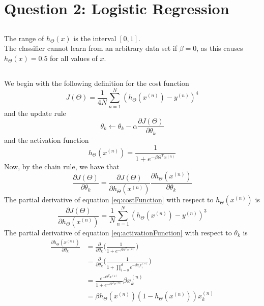 \documentclass [11pt]{article}
\begin{document}
\section{Question 2: Logistic Regression}
\subsection{}
The range of $h_{\Theta}(x)$ is the interval $[0,1]$.
\\
The classifier cannot learn from an arbitrary data set if $\beta = 0$, as this causes $h_{\Theta}(x)=0.5$ for all values of $x$.
\subsection{}
We begin with the following definition for the cost function
\begin{equation}\label{eq:costFunction}
J(\Theta) = \frac{1}{4N} \sum_{n=1}^{N}(h_{\Theta}(x^{(n)})-y^{(n)})^4
\end{equation}
and the update rule
\begin{equation}\label{eq:updateRule}
\theta_{k} \gets \theta_{k} - \alpha \frac{\partial J(\Theta)}{\partial \theta_{k}}
\end{equation}
and the activation function
\begin{equation}\label{eq:activationFunction}
h_{\Theta}(x^{(n)}) = \frac{1}{1+e^{-\beta\Theta^{T}x^{(n)}}}
\end{equation}
Now, by the chain rule, we have that
\begin{equation}\label{eq:chainRule}
\frac{\partial J(\Theta)}{\partial \theta_{k}} = \frac{\partial J(\Theta)}{\partial h_{\Theta}(x^{(n)})} \frac{\partial h_{\Theta}(x^{(n)})}{\partial \theta_{k}}
\end{equation}
The partial derivative of equation \ref{eq:costFunction} with respect to $h_{\Theta}(x^{(n)})$ is
\begin{equation}\label{eq:dJdh}
\frac{\partial J(\Theta)}{\partial h_{\Theta}(x^{(n)})} = \frac{1}{N} \sum_{n=1}^{N}(h_{\Theta}(x^{(n)})-y^{(n)})^3
\end{equation}
The partial derivative of equation \ref{eq:activationFunction} with respect to $\theta_{k}$ is
\begin{equation}\label{eq:dhdth}
\begin{split}
\frac{\partial h_{\Theta}(x^{(n)})}{\partial \theta_{k}} & = \frac{\partial}{\partial \theta_{k}}\Bigg(\frac{1}{1+e^{-\beta\Theta^{T}x^{(n)}}}\Bigg) \\
& = \frac{\partial}{\partial \theta_{k}}\Bigg(\frac{1}{1+\prod_{i=0}^{d}e^{-\beta \theta_{i} x_{i}^{(n)}}}\Bigg) \\
& = \frac{e^{-\Theta^{T}x^{(n)}}}{1+e^{-\Theta^{T}x^{(n)}}}\beta x_{k}^{(n)} \\
& = \beta h_{\Theta}(x^{(n)})(1-h_{\Theta}(x^{(n)}))x_{k}^{(n)}
\end{split}
\end{equation}
\end{document}
